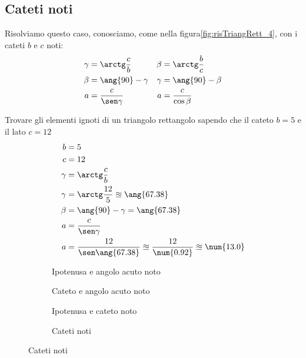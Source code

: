 \subsection{Cateti noti}
Risolviamo questo caso, conosciamo, come nella figura\nobs\vref*{fig:risTriangRett_4}, con i cateti $b$ e $c$ noti:
\begin{align*}
\gamma&=\arctg\dfrac{c}{b}&\beta&=\arctg\dfrac{b}{c}\\
\beta&=\ang{90}-\gamma&\gamma&=\ang{90}-\beta\\
a&=\dfrac{c}{\sen\gamma}&a&=\dfrac{c}{\cos\beta}
\end{align*}
\begin{esempio}
Trovare gli elementi ignoti di un triangolo rettangolo sapendo che  il cateto $b=5$ e il lato $c=12$
\begin{align*}
b&=5\\
c&=12\\
\gamma&=\arctg\dfrac{c}{b}\\
\gamma&=\arctg\dfrac{12}{5}\approxeq\ang{67.38}\\
\beta&=\ang{90}-\gamma=\ang{67.38}\\
a&=\dfrac{c}{\sen\gamma}\\
a&=\dfrac{12}{\sen\ang{67.38}}\approxeq\dfrac{12}{\num{0.92}}\approxeq\num{13.0}
\end{align*}
\end{esempio}
\begin{figure}
	\begin{subfigure}[b]{.5\linewidth}
		\centering

	\caption{Ipotenusa e angolo acuto noto}
	\label{fig:risTriangRett_1}
	\end{subfigure}%
	\begin{subfigure}[b]{.5\linewidth}
		\centering
		
		\caption{Cateto e angolo acuto noto}
		\label{fig:risTriangRett_2}
	\end{subfigure}
	\begin{subfigure}[b]{.5\linewidth}
		\centering
	
	\caption{Ipotenusa e cateto noto}
	\label{fig:risTriangRett_3}
	\end{subfigure}%
	\begin{subfigure}[b]{.5\linewidth}
		\centering
		
		\caption{Cateti noti}
		\label{fig:risTriangRett_4}
	\end{subfigure}
	\label{fig:RisoluzioneTriangoliRettangoli}
\end{figure}
